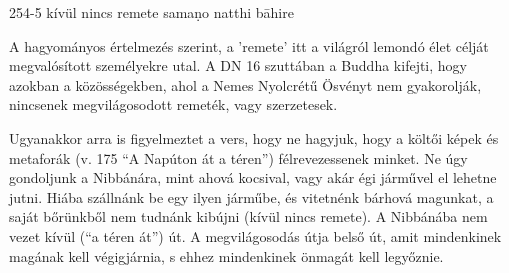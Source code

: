 
\begin{notesdescription}

\item[{254-5}
{kívül nincs remete}
{samaṇo natthi bāhire}] \hfill\par

A hagyományos értelmezés szerint, a 'remete' itt a világról lemondó élet célját megvalósított személyekre utal. A DN 16 szuttában a Buddha kifejti, hogy azokban a közösségekben, ahol a Nemes Nyolcrétű Ösvényt nem gyakorolják, nincsenek megvilágosodott remeték, vagy szerzetesek.

Ugyanakkor arra is figyelmeztet a vers, hogy ne hagyjuk, hogy a költői képek és metaforák (v. 175 ``A Napúton át a téren'') félrevezessenek minket. Ne úgy gondoljunk a Nibbánára, mint ahová kocsival, vagy akár égi járművel el lehetne jutni. Hiába szállnánk be egy ilyen járműbe, és vitetnénk bárhová magunkat, a saját bőrünkből nem tudnánk kibújni (kívül nincs remete). A Nibbánába nem vezet kívül (``a téren át'') út. A megvilágosodás útja belső út, amit mindenkinek magának kell végigjárnia, s ehhez mindenkinek önmagát kell legyőznie.

\end{notesdescription}
